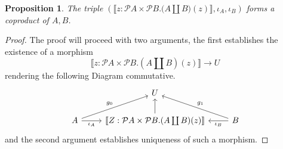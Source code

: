 \documentclass{birkjour}
\theoremstyle{plain}
\newtheorem{proposition}[thm]{Proposition}
\theoremstyle{definition}
\newcommand{\call}[1]{\mathcal{#1}}
\newcommand{\lto}{\longrightarrow}
\begin{document}
	\begin{proposition}\label{prop:coproduct}
		The triple $(\llbracket z: \call{P}A \times \call{P}B . \big(A \coprod B\big)(z) \rrbracket, \iota_A, \iota_B)$ forms a coproduct of $A,B$.
	\end{proposition}
	\begin{proof}
		The proof will proceed with two arguments, the first establishes the existence of a morphism
		\begin{equation}
			\llbracket z : \call{P}A \times \call{P}B . (A \coprod B)(z)\rrbracket \lto U
		\end{equation}
		rendering the following Diagram commutative.
		\begin{equation}\label{eq:standard_coprod_diag}
			\begin{tikzcd}
				& U\\
				A\arrow[ur,"{g_0}"]\arrow[r,swap,"{\iota_A}"] & \llbracket Z : \call{P}A \times \call{P}B . (A \coprod B)(z)\rrbracket\arrow[u] & B\arrow[ul,swap,"g_1"]\arrow[l,"{\iota_B}"]
			\end{tikzcd}
		\end{equation}
		and the second argument establishes uniqueness of such a morphism.
		

\end{proof}
\end{document}

